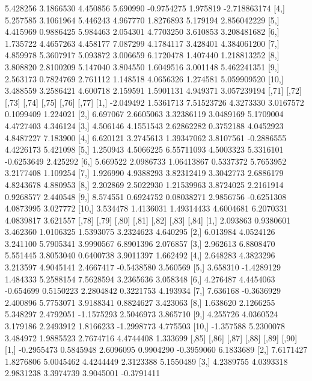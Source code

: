 \documentclass[12pt]{article}
\begin{document}
\begin{Schunk}
\begin{Soutput}
 [3,] 5.428256 3.1866530 4.450856 5.690990 -0.9754275 1.975819 -2.718863174
 [4,] 5.257585 3.1061964 5.446243 4.967770  1.8276893 5.179194  2.856042229
 [5,] 4.415969 0.9886425 5.984463 2.054301  4.7703250 3.610853  3.208481682
 [6,] 1.735722 4.4657263 4.458177 7.087299  4.1784117 3.428401  4.384061200
 [7,] 4.859978 5.3607917 5.093872 3.006659  6.1720478 1.407440  1.218813252
 [8,] 3.808820 2.8100209 5.147040 3.804550  1.6049516 3.001148  5.462241351
 [9,] 2.563173 0.7824769 2.761112 1.148518  4.0656326 1.274581  5.059909520
[10,] 3.488559 3.2586421 4.600718 2.159591  1.5901131 4.949371  3.057239194
          [,71]     [,72]      [,73]     [,74]      [,75]      [,76]    [,77]
 [1,] -2.049492 1.5361713 7.51523726 4.3273330  3.0167572  0.1099409 1.224021
 [2,]  6.697067 2.6605063 3.32386119 3.0489169  5.1709004  4.4727403 4.346124
 [3,]  4.506146 4.1551543 2.62862282 0.3752188  4.0452923  4.8487227 7.183900
 [4,]  6.620121 3.2745613 1.39347062 3.8107561 -0.2886555  4.4226173 5.421098
 [5,]  1.250943 4.5066225 6.55711093 4.5003323  5.3316101 -0.6253649 2.425292
 [6,]  5.669522 2.0986733 1.06413867 0.5337372  5.7653952  3.2177408 1.109254
 [7,]  1.926990 4.9388293 3.82312419 3.3042773  2.6886179  4.8243678 4.880953
 [8,]  2.202869 2.5022930 1.21539963 3.8724025  2.2161914  0.9268577 2.440548
 [9,]  8.574551 0.6924752 0.08038271 2.9856756 -0.6251308  4.0873995 3.027772
[10,]  3.534478 1.4136031 1.49314433 4.6004681  6.2070331  4.0839817 3.621557
          [,78]      [,79]     [,80]     [,81]      [,82]      [,83]    [,84]
 [1,]  2.093863  0.9380601  3.462360 1.0106325  1.5393075  3.2324623 4.640295
 [2,]  6.013984  4.0524126  3.241100 5.7905341  3.9990567  6.8901396 2.076857
 [3,]  2.962613  6.8808470  5.551445 3.8053040  0.6400738  3.9011397 1.662492
 [4,]  2.648283  4.3823296  3.213597 4.9045141  2.4667417 -0.5438580 3.560569
 [5,]  3.658310 -1.4289129  1.484333 5.2588154  7.5628594  3.2365636 3.058348
 [6,]  4.276487  4.4454063 -0.654699 0.5150223  2.2804842  0.3221753 4.193934
 [7,]  7.636168 -0.3636929  2.400896 5.7753071  3.9188341  0.8824627 3.423063
 [8,]  1.638620  2.1266255  5.348297 2.4792051 -1.1575293  2.5046973 3.865710
 [9,]  4.255726  4.0360524  3.179186 2.2493912  1.8166233 -1.2998773 4.775503
[10,] -1.357588  5.2300078  3.484972 1.9885523  2.7674716  4.4744408 1.333699
           [,85]     [,86]      [,87]     [,88]      [,89]      [,90]
 [1,] -0.2955473 0.5845948  2.6096095 0.9904290 -0.3959060  6.1833689
 [2,]  7.6171427 1.8276806  5.0045462 4.4244449  2.3123388  5.1550489
 [3,]  4.2389755 4.0393318  2.9831238 3.3974739  3.9045001 -0.3791411

\end{Soutput}
\end{Schunk}
\end{document}

